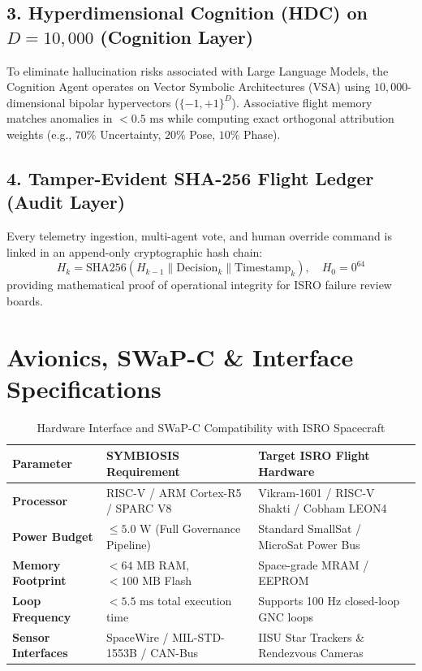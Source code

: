 \documentclass[11pt,a4paper]{article}
\begin{document}
\subsection{3. Hyperdimensional Cognition (HDC) on $D=10,000$ (Cognition Layer)}
To eliminate hallucination risks associated with Large Language Models, the Cognition Agent operates on Vector Symbolic Architectures (VSA) using $10,000$-dimensional bipolar hypervectors ($\{-1, +1\}^D$). Associative flight memory matches anomalies in $< 0.5\text{ ms}$ while computing exact orthogonal attribution weights (e.g., $70\%$ Uncertainty, $20\%$ Pose, $10\%$ Phase).

\subsection{4. Tamper-Evident SHA-256 Flight Ledger (Audit Layer)}
Every telemetry ingestion, multi-agent vote, and human override command is linked in an append-only cryptographic hash chain:
\begin{equation}
H_k = \mathrm{SHA256}(H_{k-1} \parallel \text{Decision}_k \parallel \text{Timestamp}_k), \quad H_0 = 0^{64}
\end{equation}
providing mathematical proof of operational integrity for ISRO failure review boards.

\section{Avionics, SWaP-C \& Interface Specifications}

\begin{table}[h!]
\centering
\caption{Hardware Interface and SWaP-C Compatibility with ISRO Spacecraft}
\label{tab:swap_c}
\small
\begin{tabularx}{\textwidth}{lXX}
\toprule
\textbf{Parameter} & \textbf{SYMBIOSIS Requirement} & \textbf{Target ISRO Flight Hardware} \\
\midrule
\textbf{Processor} & RISC-V / ARM Cortex-R5 / SPARC V8 & Vikram-1601 / RISC-V Shakti / Cobham LEON4 \\
\textbf{Power Budget} & $\le 5.0\text{ W}$ (Full Governance Pipeline) & Standard SmallSat / MicroSat Power Bus \\
\textbf{Memory Footprint} & $< 64\text{ MB}$ RAM, $< 100\text{ MB}$ Flash & Space-grade MRAM / EEPROM \\
\textbf{Loop Frequency} & $< 5.5\text{ ms}$ total execution time & Supports 100 Hz closed-loop GNC loops \\
\textbf{Sensor Interfaces} & SpaceWire / MIL-STD-1553B / CAN-Bus & IISU Star Trackers \& Rendezvous Cameras \\
\bottomrule
\end{tabularx}
\end{table}
\end{document}
